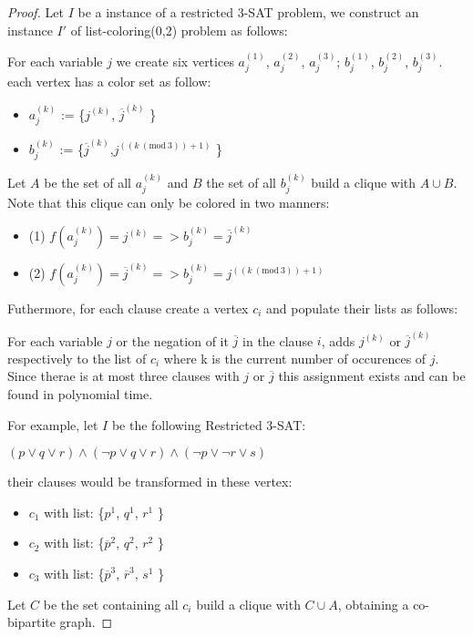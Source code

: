 \documentclass[9pt]{../document-types/entcs} \usepackage{../document-types/entcsmacro}
\newcommand{\Mod}[1]{\ (\mathrm{mod}\ #1)}
\newcommand{\?}{\textcolor{warn}{?}}
\begin{document}
\begin{proof}
Let $I$ be a instance of a restricted 3-SAT problem, we construct an instance $I'$ of list-coloring(0,2) problem as follows:

For each variable $j$ we create six vertices $a_j^{(1)}$, $a_j^{(2)}$, $a_j^{(3)}$;	$b_j^{(1)}$, $b_j^{(2)}$, $b_j^{(3)}$. each vertex has a color set as follow:
  \begin{itemize}
    \item $a_j^{(k)}$ := \{$j^{(k)}$, $\overline{j}^{(k)}$ \}
    \item $b_j^{(k)}$ := \{$\overline{j}^{(k)}$,$j^{((k \Mod{3}) + 1 )}$ \}
  \end{itemize}

Let $A$ be the set of all $a_j^{(k)}$ and $B$ the set of all $b_j^{(k)}$ build a clique with $A \cup B$.
Note that this clique can only be colored in two manners:
\begin{itemize}
	\item (1)  $f(a_j^{(k)}) = j^{(k)} => b_j^{(k)} = \overline{j}^{(k)}$
	\item (2)  $f(a_j^{(k)}) = \overline{j}^{(k)} => b_j^{(k)} = j^{((k \Mod{3}) + 1 )}$
\end{itemize}

Futhermore, for each clause create a vertex $c_i$ and populate their lists as follows:

For each variable $j$ or the negation of it $\overline{j}$ in the clause $i$, adds $j^{(k)}$ or $\overline{j}^{(k)}$ respectively to the list of $c_i$ where k is the current number of occurences of $j$. Since therae is at most three clauses with $j$ or $\overline{j}$ this assignment exists and can be found in polynomial time.

For example, let $I$ be the following Restricted 3-SAT:

$(p \lor q \lor r) \land (\neg{p} \lor q \lor r) \land (\neg{p} \lor \neg{r} \lor s)$

their clauses would be transformed in these vertex:

\begin{itemize}
	\item $c_1$ with list: \{$p^1$, $q^1$, $r^1$ \}
	\item $c_2$ with list: \{$\overline{p}^2$, $q^2$, $r^2$ \}
	\item $c_3$ with list: \{$\overline{p}^3$, $\overline{r}^3$, $s^1$ \}
\end{itemize}

		Let $C$ be the set containing all $c_i$ build a clique with $C \cup A$, obtaining a co-bipartite graph.


\end{proof}
\end{document}

